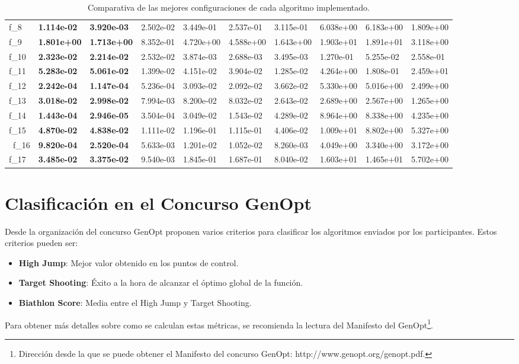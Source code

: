 \begin{table}[!ht]
{\begin{tabular}{LLLLLLLLLL}
f_{8} & {\bf 1.114e-02} & {\bf 3.920e-03} & 2.502e-02 & 3.449e-01 & 2.537e-01 & 3.115e-01 & 6.038e+00 & 6.183e+00 & 1.809e+00\\
f_{9} & {\bf 1.801e+00} & {\bf 1.713e+00} & 8.352e-01 & 4.720e+00 & 4.588e+00 & 1.643e+00 & 1.903e+01 & 1.891e+01 & 3.118e+00\\
f_{10} & {\bf 2.323e-02} & {\bf 2.214e-02} & 2.532e-02 & 3.874e-03 &  2.688e-03 & 3.495e-03 & 1.270e-01 &   5.255e-02  & 2.558e-01\\
f_{11} & {\bf 5.283e-02} & {\bf 5.061e-02} & 1.399e-02 & 4.151e-02 &  3.904e-02 & 1.285e-02 & 4.264e+00 &   1.808e-01  & 2.459e+01\\
f_{12} & {\bf 2.242e-04} & {\bf 1.147e-04} & 5.236e-04 & 3.093e-02 & 2.092e-02 & 3.662e-02 & 5.330e+00 &   5.016e+00  & 2.499e+00\\
f_{13} & {\bf 3.018e-02} & {\bf 2.998e-02} & 7.994e-03 & 8.200e-02 & 8.032e-02 & 2.643e-02 & 2.689e+00 &   2.567e+00  & 1.265e+00\\
f_{14} & {\bf 1.443e-04} & {\bf 2.946e-05} & 3.504e-04 & 3.049e-02 &  1.543e-02 & 4.289e-02 & 8.964e+00 &   8.338e+00  & 4.235e+00\\
f_{15} & {\bf 4.870e-02} & {\bf 4.838e-02} & 1.111e-02 & 1.196e-01 &  1.115e-01 & 4.406e-02 & 1.009e+01 &   8.802e+00  & 5.327e+00\\\
f_{16} & {\bf 9.820e-04} & {\bf 2.520e-04} & 5.633e-03 & 1.201e-02 &  1.052e-02 & 8.260e-03  & 4.049e+00 &   3.340e+00  & 3.172e+00\\
f_{17} & {\bf 3.485e-02} & {\bf 3.375e-02} & 9.540e-03 & 1.845e-01 &  1.687e-01 & 8.040e-02 & 1.603e+01 &   1.465e+01  & 5.702e+00\\
    \bottomrule
    \end{tabular}}
    \captionsetup{justification=centering}
    \caption{Comparativa de las mejores configuraciones de cada algoritmo implementado.}    
\end{table}
\newpage

\section{Clasificación en el Concurso GenOpt}\label{sec:Competition}

Desde la organización del concurso GenOpt proponen varios criterios para clasificar los algoritmos enviados por los participantes. Estos criterios pueden ser:

\begin{itemize}
    	  	\item \textbf{High Jump}: Mejor valor obtenido en los puntos de control.
    	  	\item \textbf{Target Shooting}: Éxito a la hora de alcanzar el óptimo global de la función.
    	  	\item \textbf{Biathlon Score}: Media entre el High Jump y Target Shooting.
\end{itemize}
Para obtener más detalles sobre como se calculan estas métricas, se recomienda la lectura del Manifesto del GenOpt\footnote{Dirección desde la que se puede obtener el Manifesto del concurso GenOpt: http://www.genopt.org/genopt.pdf.}.

